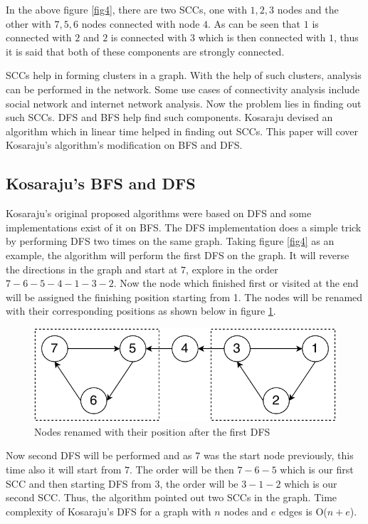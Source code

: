 \documentclass[journal,twoside,web]{ieeecolor}
\begin{document}
In the above figure \ref{fig4}, there are two SCCs, one with {$1, 2, 3$} nodes and the other with {$7, 5, 6$} nodes connected with node $4$. As can be seen that $1$ is connected with $2$ and $2$ is connected with $3$ which is then connected with $1$, thus it is said that both of these components are strongly connected.

SCCs help in forming clusters in a graph. With the help of such clusters, analysis can be performed in the network. Some use cases of connectivity analysis include social network and internet network analysis. Now the problem lies in finding out such SCCs. DFS and BFS help find such components. Kosaraju devised an algorithm which in linear time helped in finding out SCCs\cite{40}. This paper will cover Kosaraju's algorithm's modification on BFS and DFS.

\subsection{Kosaraju's BFS and DFS}
Kosaraju's original proposed algorithms were based on DFS and some implementations exist of it on BFS. The DFS implementation does a simple trick by performing DFS two times on the same graph. Taking figure \ref{fig4} as an example, the algorithm will perform the first DFS on the graph. It will reverse the directions in the graph and start at $7$, explore in the order $7-6-5-4-1-3-2$. Now the node which finished first or visited at the end will be assigned the finishing position starting from 1. The nodes will be renamed with their corresponding positions as shown below in figure \ref{fig5}. 

\begin{figure}[!h]
    \centerline{\includegraphics[scale=0.75]{figures/scc2.pdf}}
    \caption{Nodes renamed with their position after the first DFS}
    \label{fig5}
\end{figure}

Now second DFS will be performed and as $7$ was the start node previously, this time also it will start from $7$. The order will be then $7-6-5$ which is our first SCC and then starting DFS from $3$, the order will be $3-1-2$ which is our second SCC. Thus, the algorithm pointed out two SCCs in the graph. Time complexity of Kosaraju’s DFS for a graph with $n$ nodes and $e$ edges is O($n + e$).
\end{document}
